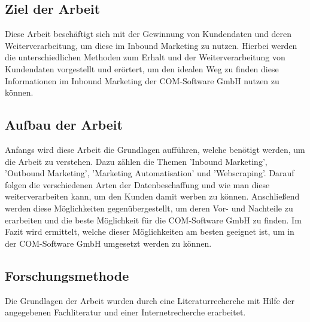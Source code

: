 \documentclass[hidelinks,12pt,a4paper]{article}
\begin{document}
	\subsection{Ziel der Arbeit}
	Diese Arbeit beschäftigt sich mit der Gewinnung von Kundendaten und deren Weiterverarbeitung, um diese im Inbound Marketing zu nutzen. Hierbei werden die unterschiedlichen Methoden zum Erhalt und der Weiterverarbeitung von Kundendaten vorgestellt und erörtert, um den idealen Weg zu finden diese Informationen im Inbound Marketing der COM-Software GmbH nutzen zu können.
	
	\subsection{Aufbau der Arbeit}
	Anfangs wird diese Arbeit die Grundlagen aufführen, welche benötigt werden, um die Arbeit zu verstehen. Dazu zählen die Themen 'Inbound Marketing', 'Outbound Marketing', 'Marketing Automatisation' und 'Webscraping'.
	\newline
	Darauf folgen die verschiedenen Arten der Datenbeschaffung und wie man diese weiterverarbeiten kann, um den Kunden damit werben zu können. Anschließend werden diese Möglichkeiten gegenübergestellt, um deren Vor- und Nachteile zu erarbeiten und die beste Möglichkeit für die COM-Software GmbH zu finden.
	\newline
	Im Fazit wird ermittelt, welche dieser Möglichkeiten am besten geeignet ist, um in der COM-Software GmbH umgesetzt werden zu können.
	
	\subsection{Forschungsmethode}
	Die Grundlagen der Arbeit wurden durch eine Literaturrecherche mit Hilfe der angegebenen Fachliteratur und einer Internetrecherche erarbeitet.
	
	
	
	
	
	\newpage
	
	
	
	\newpage
	
	
	
	
	\newpage
	
	
	
	\newpage
	
	
	
	\newpage
	\setcounter{page}{5}
	
	
\end{document}
